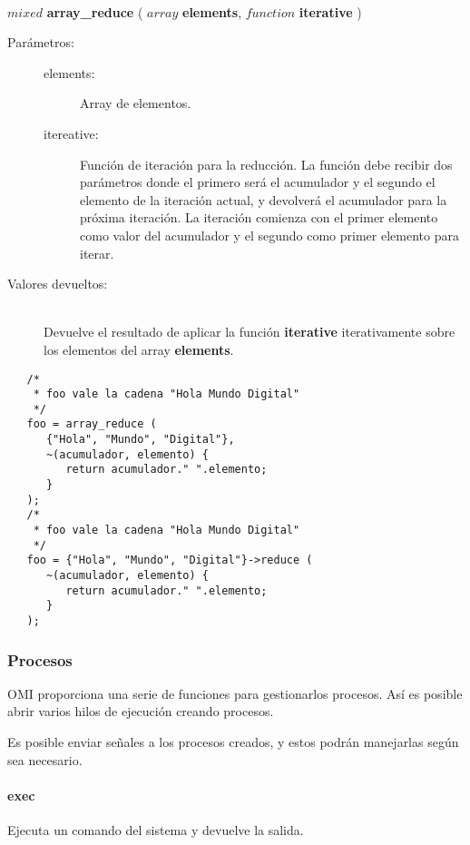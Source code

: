 \begin{framed}
\hfill \\ $mixed$ \textbf{array\_reduce} ( $array$ \textbf{elements}, $function$ \textbf{iterative} )  
\begin{description}
\item [Parámetros:] \hfill 
   \begin{description}
   \item[elements:] Array de elementos.
   \item[itereative:] Función de iteración para la reducción. La función debe recibir dos parámetros donde el primero
   será el acumulador y el segundo el elemento de la iteración actual, y devolverá el acumulador para la próxima iteración.
   La iteración comienza con el primer elemento como valor del acumulador y el segundo como primer elemento para iterar.
   \end{description}
\item[Valores devueltos:] \hfill \\
   Devuelve el resultado de aplicar la función \textbf{iterative} iterativamente sobre los elementos del array \textbf{elements}.
\end{description}
\end{framed}
     
\begin{lstlisting}   
   /*
    * foo vale la cadena "Hola Mundo Digital"
    */
   foo = array_reduce (
      {"Hola", "Mundo", "Digital"}, 
      ~(acumulador, elemento) { 
         return acumulador." ".elemento;
      }
   ); 
   /*
    * foo vale la cadena "Hola Mundo Digital"
    */
   foo = {"Hola", "Mundo", "Digital"}->reduce (
      ~(acumulador, elemento) { 
         return acumulador." ".elemento;
      }
   );
\end{lstlisting}

\subsubsection{Procesos}
OMI proporciona una serie de funciones para gestionarlos procesos. Así es posible abrir varios
hilos de ejecución creando procesos.

Es posible enviar señales a los procesos creados, y estos podrán manejarlas según sea necesario. 

\paragraph{exec}
Ejecuta un comando del sistema y devuelve la salida.

